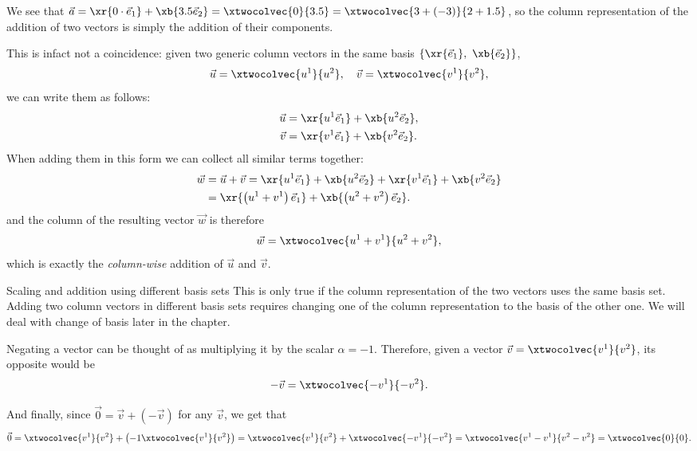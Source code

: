 We see that $\vec{a}=\xr{0\cdot\vec{e}_{1}}+\xb{3.5\vec{e}_{2}}=\xtwocolvec{0}{3.5} = \xtwocolvec{3+(-3)}{2+1.5}$, so the column representation of the addition of two vectors is simply the addition of their components.

This is infact not a coincidence: given two generic column vectors in the same basis $\left\{\xr{\vec{e}_{1}},\ \xb{\vec{e}_{2}}\right\}$,
\[
  \vec{u}=\xtwocolvec{u^{1}}{u^{2}},\quad\vec{v}=\xtwocolvec{v^{1}}{v^{2}},
\]
we can write them as follows:
\begin{align*}
  \vec{u} &= \xr{u^{1}\vec{e}_{1}} + \xb{u^{2}\vec{e}_{2}},\\
  \vec{v} &= \xr{v^{1}\vec{e}_{1}} + \xb{v^{2}\vec{e}_{2}}.
\end{align*}
When adding them in this form we can collect all similar terms together:
\begin{align*}
  \vec{w} &= \vec{u} + \vec{v} = \xr{u^{1}\vec{e}_{1}} + \xb{u^{2}\vec{e}_{2}} + \xr{v^{1}\vec{e}_{1}} + \xb{v^{2}\vec{e}_{2}}\\
          &= \xr{\left(u^{1}+v^{1}\right)\vec{e}_{1}} + \xb{\left(u^{2}+v^{2}\right)\vec{e}_{2}}.
\end{align*}
and the column of the resulting vector $\vec{w}$ is therefore
\[
  \vec{w} = \xtwocolvec{u^{1}+v^{1}}{u^{2}+v^{2}},
\]
which is exactly the \emph{column-wise} addition of $\vec{u}$ and $\vec{v}$.

\begin{note}{Scaling and addition using different basis sets}{}
This is only true if the column representation of the two vectors uses the same basis set. Adding two column vectors in different basis sets requires changing one of the column representation to the basis of the other one. We will deal with change of basis later in the chapter.
\end{note}

Negating a vector can be thought of as multiplying it by the scalar $\alpha=-1$. Therefore, given a vector $\vec{v}=\xtwocolvec{v^{1}}{v^{2}}$, its opposite would be
\begin{equation}
  -\vec{v}=\xtwocolvec{-v^{1}}{-v^{2}}.
  \label{eq:column_representation_opposite}
\end{equation}

And finally, since $\vec{0}=\vec{v}+\left(-\vec{v}\right)$ for any $\vec{v}$, we get that
\begin{equation}
  \vec{0} = \xtwocolvec{v^{1}}{v^{2}}+\left(-1\xtwocolvec{v^{1}}{v^{2}}\right) = \xtwocolvec{v^{1}}{v^{2}}+\xtwocolvec{-v^{1}}{-v^{2}} = \xtwocolvec{v^{1}-v^{1}}{v^{2}-v^{2}} = \xtwocolvec{0}{0}.
  \label{eq:column_representation_zero_vec}
\end{equation}

